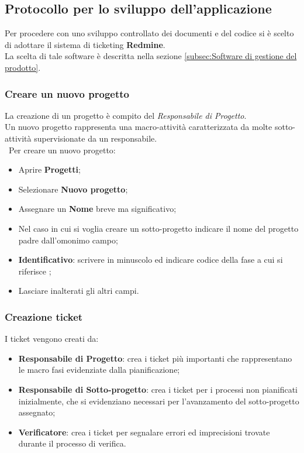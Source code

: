 \subsection{Protocollo per lo sviluppo dell'applicazione}
\label{sec:protocolloSviluppo} 
Per procedere con uno sviluppo controllato dei documenti e del codice si è scelto di adottare il sistema di ticketing \textbf{Redmine}.\\ 
La scelta di tale software è descritta nella sezione \ref{subsec:Software di gestione del prodotto}.

\subsubsection{Creare un nuovo progetto} 

La creazione di un progetto è compito del \emph{Responsabile di Progetto}.\\ 
Un nuovo progetto rappresenta una macro-attività caratterizzata da molte sotto-attività supervisionate da un responsabile.\\\
Per creare un nuovo progetto:
\begin{itemize}
\item Aprire \textbf{Progetti}; 
\item Selezionare \textbf{Nuovo progetto}; 
\item Assegnare un \textbf{Nome} breve ma significativo; 
\item Nel caso in cui si voglia creare un sotto-progetto indicare il nome del progetto padre dall’omonimo campo; 
\item \textbf{Identificativo}: scrivere in minuscolo ed indicare codice\ped{g} della fase a cui si riferisce ;
\item Lasciare inalterati gli altri campi. 
\end{itemize}
 
\subsubsection{Creazione ticket}
 
  I ticket vengono creati da:
 \begin{itemize}
 

    \item \textbf{Responsabile di Progetto}: crea i ticket più importanti che rappresentano le macro fasi evidenziate dalla pianificazione; 
	\item \textbf{Responsabile di Sotto-progetto}: crea i ticket per i processi non pianificati inizialmente, che si evidenziano necessari per l’avanzamento del sotto-progetto\ped{g} assegnato; 
	\item \textbf{Verificatore}: crea i ticket\ped{g} per segnalare errori ed imprecisioni trovate durante il processo\ped{g} di verifica. 
 \end{itemize}


